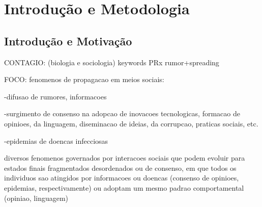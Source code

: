 \documentclass[a4paper,11pt]{report}
\newcommand{\linespacing}{1.5}
\renewcommand{\baselinestretch}{\linespacing}
\begin{document}





\newpage
{}
\tableofcontents


\newpage
{}




\chapter{Introdu\c{c}\~ao e Metodologia}
\label{chap:intro}

\section{Introdu\c{c}\~ao e Motiva\c{c}\~ao}

CONTAGIO: (biologia e sociologia)  keywords PRx rumor+spreading

FOCO: fenomenos de propagacao em meios sociais: 

-difusao de rumores, informacoes

-surgimento de consenso na adopcao de inovacoes tecnologicas, 
 formacao de opinioes, da linguagem, diseminacao de ideias, 
da corrupcao, praticas sociais, etc.

-epidemias de doencas infecciosas 

diversos fenomenos governados por interacoes sociais
que podem evoluir para estados finais fragmentados desordenados 
ou de consenso, em que todos os individuos sao atingidos por 
informacoes ou doencas (consenso de opinioes, epidemias, 
respectivamente) ou adoptam um mesmo padrao comportamental 
(opiniao, linguagem) \cite{BOCCALETTI:2006gb}
\end{document}
